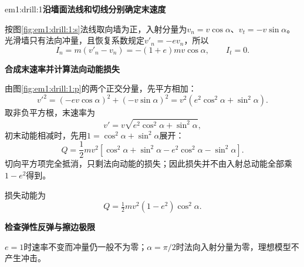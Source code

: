 \LectureAnswerSection

\begin{drillsolution}{em1:drill:1}\textbf{沿墙面法线和切线分别确定末速度}\par\nobreak
按图\ref{fig:em1:drill:1:s}法线取向墙为正，入射分量为$v_n=v\cos\alpha$、$v_t=-v\sin\alpha$。光滑墙只有法向冲量，且恢复系数规定$v'_n=-ev_n$，所以
\[I_n=m(v'_n-v_n)=-(1+e)mv\cos\alpha,\qquad I_t=0.\]



\par\medskip{}\noindent\textbf{合成末速率并计算法向动能损失}\par\nobreak
由图\ref{fig:em1:drill:1:p}的两个正交分量，先平方相加：
\[
v'^2=(-ev\cos\alpha)^2+(-v\sin\alpha)^2
=v^2(e^2\cos^2\alpha+\sin^2\alpha).
\]
取非负平方根，末速率为
\[\boxed{v'=v\sqrt{e^2\cos^2\alpha+\sin^2\alpha}},\]
初末动能相减时，先用$1=\cos^2\alpha+\sin^2\alpha$展开：
\[
Q=\frac12mv^2[\cos^2\alpha+\sin^2\alpha
-e^2\cos^2\alpha-\sin^2\alpha].
\]
切向平方项完全抵消，只剩法向动能的损失；因此损失并不由入射总动能全部乘$1-e^2$得到。

损失动能为
\[\boxed{Q=\tfrac12mv^2(1-e^2)\cos^2\alpha}.\]


\par\medskip{}\noindent\textbf{检查弹性反弹与擦边极限}\par\nobreak
$e=1$时速率不变而冲量仍一般不为零；$\alpha=\pi/2$时法向入射分量为零，理想模型不产生冲击。\end{drillsolution}
